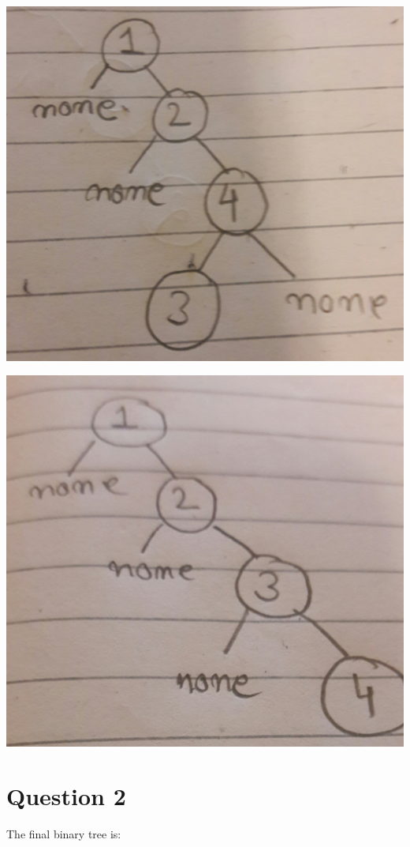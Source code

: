\documentclass{article}
\begin{document}
\includegraphics[scale=0.05]{13.jpg}





\includegraphics[scale=0.05]{14.jpg}




\section*{Question 2}
The final binary tree is:
\end{document}
